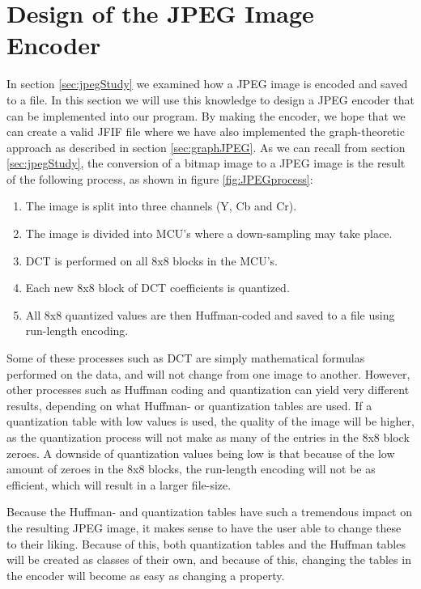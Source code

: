 \section{Design of the JPEG Image Encoder}
\label{sec:designJPEG}
In section \ref{sec:jpegStudy} we examined how a JPEG image is encoded and saved to a file.
In this section we will use this knowledge to design a JPEG encoder that can be implemented into our program.
By making the encoder, we hope that we can create a valid JFIF file where we have also implemented the graph-theoretic approach as described in section \ref{sec:graphJPEG}.
As we can recall from section \ref{sec:jpegStudy}, the conversion of a bitmap image to a JPEG image is the result of the following process, as shown in figure \ref{fig:JPEGprocess}:

\begin{enumerate}
	\item The image is split into three channels (Y, Cb and Cr).
	\item The image is divided into MCU's where a down-sampling may take place.
	\item DCT is performed on all 8x8 blocks in the MCU's.
	\item Each new 8x8 block of DCT coefficients is quantized.
	\item All 8x8 quantized values are then Huffman-coded and saved to a file using run-length encoding.
\end{enumerate}

Some of these processes such as DCT are simply mathematical formulas performed on the data, and will not change from one image to another.
However, other processes such as Huffman coding and quantization can yield very different results, depending on what Huffman- or quantization tables are used.
If a quantization table with low values is used, the quality of the image will be higher, as the quantization process will not make as many of the entries in the 8x8 block zeroes.
A downside of quantization values being low is that because of the low amount of zeroes in the 8x8 blocks, the run-length encoding will not be as efficient, which will result in a larger file-size.

Because the Huffman- and quantization tables have such a tremendous impact on the resulting JPEG image, it makes sense to have the user able to change these to their liking.
Because of this, both quantization tables and the Huffman tables will be created as classes of their own, and because of this, changing the tables in the encoder will become as easy as changing a property.

